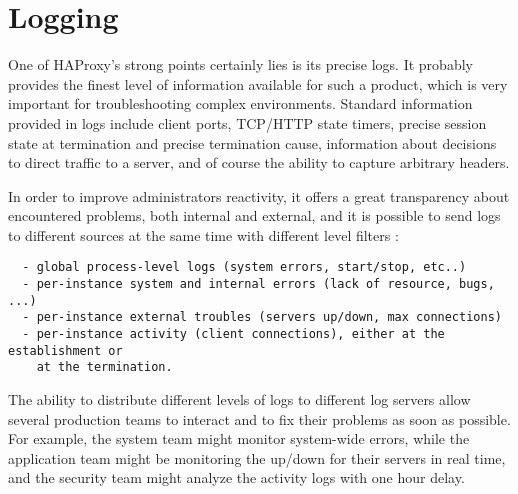 
\chapter{Logging}

One of HAProxy's strong points certainly lies is its precise logs. It probably
provides the finest level of information available for such a product, which is
very important for troubleshooting complex environments. Standard information
provided in logs include client ports, TCP/HTTP state timers, precise session
state at termination and precise termination cause, information about decisions
to direct traffic to a server, and of course the ability to capture arbitrary
headers.


In order to improve administrators reactivity, it offers a great transparency
about encountered problems, both internal and external, and it is possible to
send logs to different sources at the same time with different level filters :

\begin{verbatim}
  - global process-level logs (system errors, start/stop, etc..)
  - per-instance system and internal errors (lack of resource, bugs, ...)
  - per-instance external troubles (servers up/down, max connections)
  - per-instance activity (client connections), either at the establishment or
    at the termination.
\end{verbatim}


The ability to distribute different levels of logs to different log servers
allow several production teams to interact and to fix their problems as soon
as possible. For example, the system team might monitor system-wide errors,
while the application team might be monitoring the up/down for their servers in
real time, and the security team might analyze the activity logs with one hour
delay.

